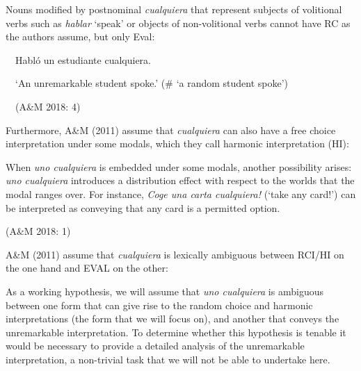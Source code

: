 \begin{styleStandard}
Nouns modified by postnominal \textit{cualquiera} that represent subjects of volitional verbs such as \textit{hablar} ‘speak’ or objects of non-volitional verbs cannot have RC as the authors assume, but only Eval:
\end{styleStandard}

\begin{styleStandard}
\ \ Habló un estudiante cualquiera.
\end{styleStandard}

\begin{styleStandard}
\ \ ‘An unremarkable student spoke.’ (\# ‘a random student spoke’)
\end{styleStandard}

\begin{styleStandard}
\ \ (A\&M 2018: 4)
\end{styleStandard}

\begin{styleStandard}
Furthermore, A\&M (2011) assume that \textit{cualquiera} can also have a free choice interpretation under some modals, which they call harmonic interpretation (HI): 
\end{styleStandard}

\begin{styleStandard}
When \textit{uno cualquiera} is embedded under some modals, another possibility arises: \textit{uno cualquiera} introduces a distribution effect with respect to the worlds that the modal ranges over. For instance, \textit{Coge una carta cualquiera!} (‘take any card!’) can be interpreted as conveying that any card is a permitted option. 
\end{styleStandard}

\begin{styleStandard}
(A\&M 2018: 1)
\end{styleStandard}

\begin{styleStandard}
A\&M (2011) assume that \textit{cualquiera} is lexically ambiguous between RCI/HI on the one hand and EVAL on the other:
\end{styleStandard}

\begin{styleStandard}
As a working hypothesis, we will assume that \textit{uno cualquiera} is ambiguous between one form that can give rise to the random choice and harmonic interpretations (the form that we will focus on), and another that conveys the unremarkable interpretation. To determine whether this hypothesis is tenable it would be necessary to provide a detailed analysis of the unremarkable interpretation, a non-trivial task that we will not be able to undertake here.
\end{styleStandard}

